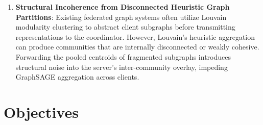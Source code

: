 \documentclass[12pt,a4paper]{report}
\begin{document}
\begin{enumerate}
    \item \textbf{Structural Incoherence from Disconnected Heuristic Graph Partitions}: Existing federated graph systems often utilize Louvain modularity clustering to abstract client subgraphs before transmitting representations to the coordinator. However, Louvain's heuristic aggregation can produce communities that are internally disconnected or weakly cohesive. Forwarding the pooled centroids of fragmented subgraphs introduces structural noise into the server's inter-community overlay, impeding GraphSAGE aggregation across clients.
\end{enumerate}

\section{Objectives}\label{sec:objectives}
\end{document}
